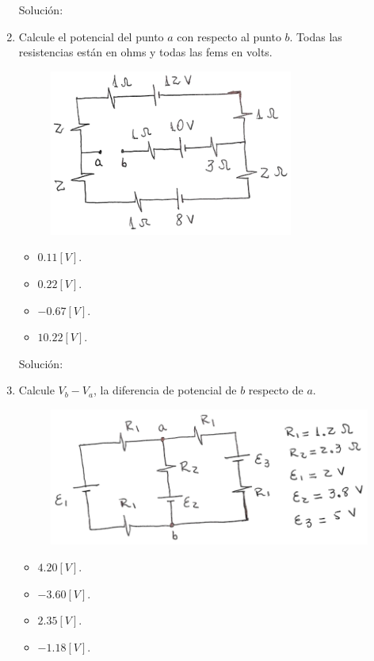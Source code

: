 \documentclass[letter,11pt]{article}
\begin{document}
\begin{enumerate}
Solución: \\

\item Calcule el potencial del punto $a$ con respecto al punto $b$. Todas las
resistencias están en ohms y todas las fems en volts.

\begin{figure}[!h]
\centering
\includegraphics[scale=1.80]{resources/q7.eps}
\end{figure}

\begin{itemize}
    \item $ 0.11 [V]$.
    \item $ 0.22 [V]$.
    \item $-0.67 [V]$.
    \item $10.22 [V]$.
\end{itemize}

Solución: \\

\item Calcule $V_b - V_a$, la diferencia de potencial de $b$ respecto de $a$.

\begin{figure}[!h]
\centering
\includegraphics[scale=2.00]{resources/q8.eps}
\end{figure}

\begin{itemize}
    \item $ 4.20 [V]$.
    \item $-3.60 [V]$.
    \item $ 2.35 [V]$.
    \item $-1.18 [V]$.
\end{itemize}


\end{enumerate}
\end{document}
